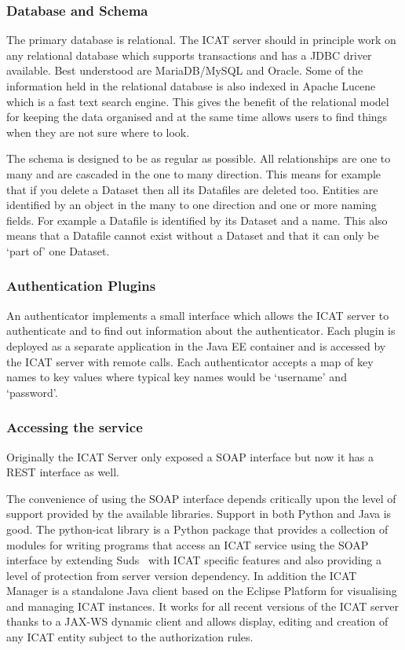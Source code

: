 \documentclass[a4paper]{jpconf}
\begin{document}
\subsubsection{Database and Schema}
The primary database is relational. The ICAT server should in
principle work on any relational database which supports transactions
and has a JDBC driver available. Best understood are MariaDB/MySQL and
Oracle. Some of the information held in the relational database is
also indexed in Apache Lucene which is a fast text search engine.
This gives the benefit of the relational model for keeping the data
organised and at the same time allows users to find things when they
are not sure where to look.

The schema is designed to be as regular as possible. All relationships
are one to many and are cascaded in the one to many direction. This
means for example that if you delete a Dataset then all its Datafiles
are deleted too. Entities are identified by an object in the many to
one direction and one or more naming fields. For example a Datafile is
identified by its Dataset and a name. This also means that a Datafile
cannot exist without a Dataset and that it can only be `part of' one
Dataset.

\subsubsection{Authentication Plugins}
An authenticator implements a small interface which allows the ICAT
server to authenticate and to find out information about the
authenticator. Each plugin is deployed as a separate application in
the Java EE container and is accessed by the ICAT server with remote
calls. Each authenticator accepts a map of key names to key values
where typical key names would be `username' and `password'.

\subsubsection{Accessing the service}
Originally the ICAT Server only exposed a SOAP interface but now it
has a REST interface as well.

The convenience of using the SOAP interface depends critically upon
the level of support provided by the available libraries. Support in
both Python and Java is good. The python-icat library is a Python
package that provides a collection of modules for writing programs
that access an ICAT service using the SOAP interface by extending
Suds~\cite{ref:suds_jurko} with ICAT specific features and also
providing a level of protection from server version dependency. In
addition the ICAT Manager is a standalone Java client based on the
Eclipse Platform for visualising and managing ICAT instances. It works
for all recent versions of the ICAT server thanks to a JAX-WS dynamic
client and allows display, editing and creation of any ICAT entity
subject to the authorization rules.
\end{document}
